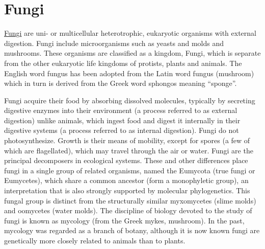 \chapter{Fungi}\label{fungi}

\href{https://en.wikipedia.org/wiki/Fungus}{Fungi} are uni- or
multicellular heterotrophic, eukaryotic organisms with external
digestion. Fungi include microorganisms such as yeasts and molds and
mushrooms. These organisms are classified as a kingdom, Fungi, which is
separate from the other eukaryotic life kingdoms of protists, plants and
animals. The English word fungus has been adopted from the Latin word
fungus (mushroom) which in turn is derived from the Greek word sphongos
meaning ``sponge''.

Fungi acquire their food by absorbing dissolved molecules, typically by
secreting digestive enzymes into their environment (a process referred
to as external digestion) unlike animals, which ingest food and digest
it internally in their digestive systems (a process referred to as
internal digestion). Fungi do not photosynthesize. Growth is their means
of mobility, except for spores (a few of which are flagellated), which
may travel through the air or water. Fungi are the principal decomposers
in ecological systems. These and other differences place fungi in a
single group of related organisms, named the Eumycota (true fungi or
Eumycetes), which share a common ancestor (form a monophyletic group),
an interpretation that is also strongly supported by molecular
phylogenetics. This fungal group is distinct from the structurally
similar myxomycetes (slime molds) and oomycetes (water molds). The
discipline of biology devoted to the study of fungi is known as mycology
(from the Greek mykes, mushroom). In the past, mycology was regarded as
a branch of botany, although it is now known fungi are genetically more
closely related to animals than to plants.

